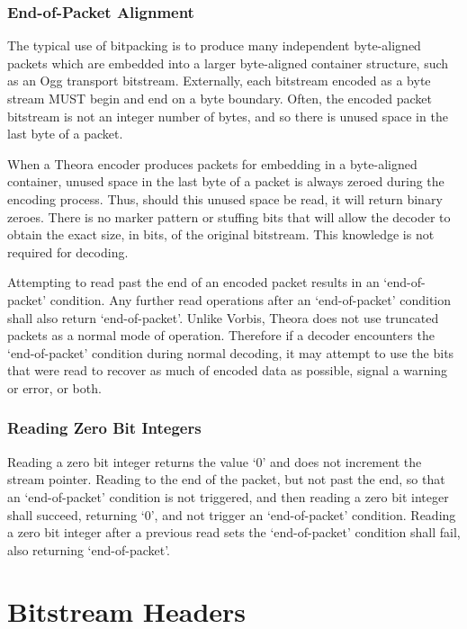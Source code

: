 \documentclass[9pt,letterpaper]{book}
\numberwithin{equation}{chapter}
\numberwithin{figure}{chapter}
\numberwithin{table}{chapter}
\begin{document}
\subsection{End-of-Packet Alignment}

The typical use of bitpacking is to produce many independent byte-aligned
 packets which are embedded into a larger byte-aligned container structure,
 such as an Ogg transport bitstream.
Externally, each bitstream encoded as a byte stream MUST begin and end on a
 byte boundary.
Often, the encoded packet bitstream is not an integer number of bytes, and so
 there is unused space in the last byte of a packet.

When a Theora encoder produces packets for embedding in a byte-aligned
 container, unused space in the last byte of a packet is always zeroed during
 the encoding process.
Thus, should this unused space be read, it will return binary zeroes.
There is no marker pattern or stuffing bits that will allow the decoder to
 obtain the exact size, in bits, of the original bitstream.
This knowledge is not required for decoding.

Attempting to read past the end of an encoded packet results in an
 `end-of-packet' condition.
Any further read operations after an `end-of-packet' condition shall also
 return `end-of-packet'.
Unlike Vorbis, Theora does not use truncated packets as a normal mode of
 operation.
Therefore if a decoder encounters the `end-of-packet' condition during normal
 decoding, it may attempt to use the bits that were read to recover as much of
 encoded data as possible, signal a warning or error, or both.

\subsection{Reading Zero Bit Integers}

Reading a zero bit integer returns the value `$0$' and does not increment
 the stream pointer.
Reading to the end of the packet, but not past the end, so that an
 `end-of-packet' condition is not triggered, and then reading a zero bit
 integer shall succeed, returning `$0$', and not trigger an `end-of-packet'
 condition.
Reading a zero bit integer after a previous read sets the `end-of-packet'
 condition shall fail, also returning `end-of-packet'.

\chapter{Bitstream Headers}
\label{sec:headers}
\end{document}
